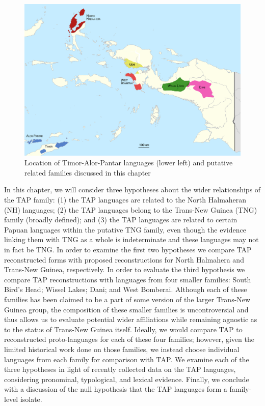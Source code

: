 \begin{figure}\centering
\includegraphics[width=\textwidth]{figures/Holton_ch4_fig1.pdf}
\caption{Location of Timor-Alor-Pantar languages (lower left) and putative related families discussed in this chapter}
\label{fig:4:1}
\end{figure}

In this chapter, we will consider three hypotheses about the wider relationships of the TAP family: (1) the TAP languages are related to the North Halmaheran (NH) languages; (2) the TAP languages belong to the Trans-New Guinea (TNG) family (broadly defined); and (3) the TAP languages are related to certain Papuan languages within the putative TNG family, even though the evidence linking them with TNG as a whole is indeterminate and these languages may not in fact be TNG. In order to examine the first two hypotheses we compare TAP reconstructed forms with proposed reconstructions for North Halmahera and Trans-New Guinea, respectively. In order to evaluate the third hypothesis we compare TAP reconstructions with languages from four smaller families: South Bird's Head; Wissel Lakes; Dani; and West Bomberai. Although each of these families has been claimed to be a part of some version of the larger Trans-New Guinea group, the composition of these smaller families is uncontroversial and thus allows us to evaluate
potential wider affiliations while remaining agnostic as to the status of Trans-New Guinea itself. Ideally, we would compare TAP to reconstructed proto-languages for each of these four families; however, given the limited historical work done on those families, we instead choose individual languages from each family for comparison with TAP. We examine each of the three hypotheses in light of recently collected data on the TAP languages, considering pronominal, typological, and lexical evidence. Finally, we conclude with a discussion of the null hypothesis that the TAP languages form a family-level isolate.

